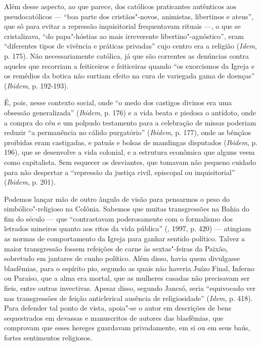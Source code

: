 Além desse aspecto, ao que parece, dos católicos praticantes autênticos
aos pseudocatólicos --- ``boa parte dos cristãos"-novos, animistas,
libertinos e ateus'', que só para evitar a repressão inquisitorial
frequentavam rituais ---, o que se cristalizava, ``do papa"-hóstias ao mais
irreverente libertino"-agnóstico'', eram ``diferentes tipos de vivência e
práticas privadas'' cujo centro era a religião (\emph{Idem}, p. 175).
Não necessariamente católica, já que são correntes as denúncias contra
aqueles que recorriam a feiticeiros e feiticeiras quando ``os exorcismos
da Igreja e os remédios da botica não surtiam efeito na cura de
variegada gama de doenças'' (\emph{Ibidem}, p. 192-193).

É, pois, nesse contexto social, onde ``o medo dos castigos divinos era
uma obsessão generalizada'' (\emph{Ibidem}, p. 176) e a vida beata e
piedosa o antídoto, onde a compra do céu e um polpudo testamento para a
celebração de missas poderiam reduzir ``a permanência no cálido
purgatório'' (\emph{Ibidem}, p. 177), onde as bênçãos proibidas eram
castigadas, e patuás e bolsas de mandingas disputados (\emph{Ibidem}, p.
196), que se desenvolve a vida colonial, e a estrutura econômica que
alguns veem como capitalista. Sem esquecer os desviantes, que tomavam
não pequeno cuidado para não despertar a ``repressão da justiça civil,
episcopal ou inquisitorial'' (\emph{Ibidem}, p. 201).

Podemos lançar mão de outro ângulo de visão para pensarmos o peso do
simbólico"-religioso na Colônia. Sabemos que muitas transgressões na
Bahia do fim do século  --- que ``contrastavam poderosamente com o
formalismo dos letrados mineiros quanto aos ritos da vida pública''
(, 1997, p. 420) --- atingiam as normas de comportamento da Igreja
para ganhar sentido político. Talvez a maior transgressão fossem
refeições de carne às sextas"-feiras da Paixão, sobretudo em jantares de
cunho político. Além disso, havia quem divulgasse blasfêmias, para o
espírito pio, segundo as quais não haveria Juízo Final, Inferno ou
Paraíso, que a alma era mortal, que as mulheres casadas não precisavam
ser fieis, entre outras invectivas. Apesar disso, segundo Jancsó, seria
``equivocado ver nas transgressões de feição anticlerical ausência de
religiosidade'' (\emph{Idem}, p. 418). Para defender tal ponto de
vista, apoia"-se o autor em descrições de bens sequestrados em devassas e
manuscritos de autores das blasfêmias, que comprovam que esses hereges
guardavam privadamente, em si ou em seus baús, fortes sentimentos
religiosos.

